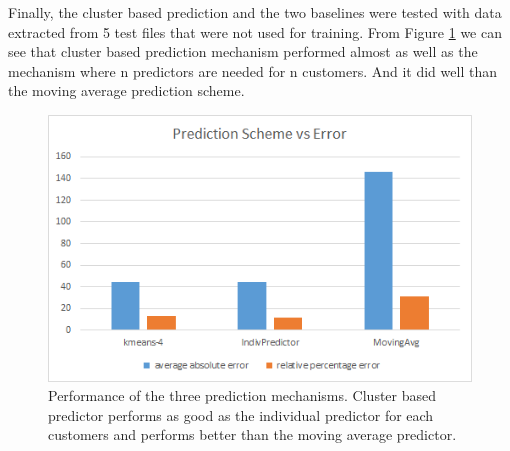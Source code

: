 Finally, the cluster based prediction and the two baselines were tested with data extracted from 5 test files that were not used for training. From Figure \ref{fig:prediction-scheme-vs-error} we can see that cluster based prediction mechanism performed almost as well as the mechanism where n predictors are needed for n customers. And it did well than the moving average prediction scheme.

\begin{figure}[h!]
  \includegraphics[width=\linewidth]{prediction-scheme-vs-error.png}
  \caption{Performance of the three prediction mechanisms. Cluster based predictor performs as good as the individual predictor for each customers and performs better than the moving average predictor. }
  \label{fig:prediction-scheme-vs-error}
\end{figure}